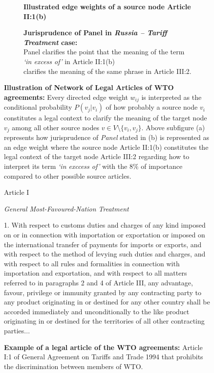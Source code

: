 \begin{figure}[]
    \captionsetup[subfigure]{justification=centering}
    \begin{subfigure}[b]{1\textwidth}
        \centering{
            
        }
        \caption{\textbf{Illustrated edge weights of a source node Article II:1(b)}}
        \label{subfig:a:art2b}
    \end{subfigure}
    \vfill
    \begin{subfigure}[b]{1\textwidth}
        \centering{
            
        }
        \centering
        \caption{\textbf{Jurisprudence of Panel in \textit{Russia – Tariff Treatment} case:} \\ Panel clarifies the point that the meaning of the term \textit{`in excess of'} in Article II:1(b) \\ clarifies the meaning of the same phrase in Article III:2.}
        \label{subfig:a:condprob}
    \end{subfigure}
    \caption{\textbf{Illustration of Network of Legal Articles of WTO agreements: }Every directed edge weight $w_{ij}$ is interpreted as the conditional probability $P(v_j|v_i)$ of how probably a source node $v_i$ constitutes a legal context to clarify the meaning of the target node $v_j$ among all other source nodes $v\in V \setminus \{v_i, v_{j}\}$. Above subfigure (a) represents how jurisprudence of \textit{Panel} stated in (b) is represented as an edge weight where the source node Article II:1(b) constitutes the legal context of the target node Article III:2 regarding how to interpret its term \textit{`in exccess of'} with the $8\%$ of importance compared to other possible source articles.}
    \label{fig:def-example}
\end{figure}



\begin{figure}[]
    \begin{center}
        Article I
    \end{center}
    \begin{center}
        \textit{General Most-Favoured-Nation Treatment}
    \end{center}
    1. With respect to customs duties and charges of any kind imposed on or in connection
    with importation or exportation or imposed on the international transfer of payments for
    imports or exports, and with respect to the method of levying such duties and charges, and
    with respect to all rules and formalities in connection with importation and exportation, and
    with respect to all matters referred to in paragraphs 2 and 4 of Article III, any advantage,
    favour, privilege or immunity granted by any contracting party to any product originating in
    or destined for any other country shall be accorded immediately and unconditionally to the
    like product originating in or destined for the territories of all other contracting parties...
    \caption{\textbf{Example of a legal article of the WTO agreements:} Article I:1 of General Agreement on Tariffs and Trade 1994 that prohibits the discrimination between members of WTO.}
    \label{fig:gatt_art1}
\end{figure}
